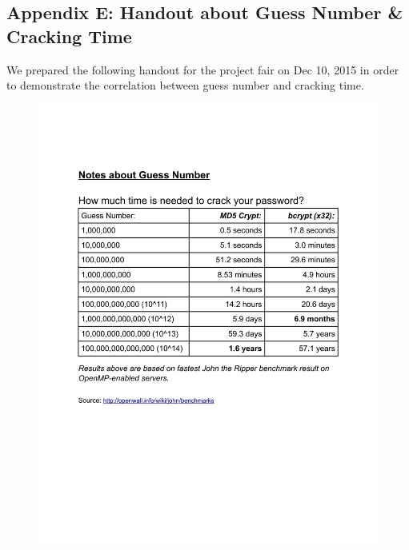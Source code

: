 \documentclass{article} %
\theoremstyle{definition}
\theoremstyle{theorem}
\theoremstyle{remark}
\theoremstyle{remark}
\begin{document}
\vspace{\fill}
\pagebreak
\subsection*{Appendix E: Handout about Guess Number \& Cracking Time}
    \par\quad We prepared the following handout for the project fair on Dec 10, 2015 in order to demonstrate the correlation between guess number and cracking time.
    \begin{figure}[!htbp]
        \vspace{-60pt}
        \begin{center}
            \includegraphics[width=.95\textwidth]{diag/guess-number-handout.pdf}
        \end{center}
        \vspace{-20pt}
        \label{fig:handout}
    \end{figure}
\end{document}
